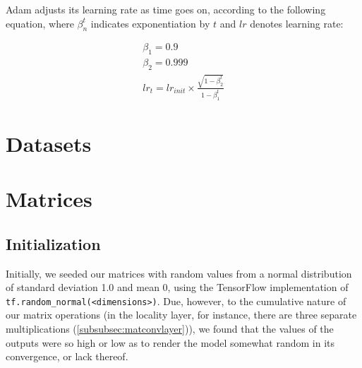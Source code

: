 Adam adjusts its learning rate as time goes on, according to the following 
equation, where $\beta_n^t$ indicates exponentiation by $t$ and $lr$ denotes 
learning rate:
\begin{figure}[h]
	\begin{minipage}[b]{.38\textwidth}
		\centering
		\begin{gather}
			\nonumber
			\beta_1 = 0.9\\
			\nonumber
			\beta_2 = 0.999\\
			\nonumber
			lr_t = lr_{init} \times \frac{\sqrt{1-\beta_2^t}}{1-\beta_1^t}
		\end{gather}
	\end{minipage}
	\hfill
	\begin{minipage}{.6\textwidth}
		\centering
	\end{minipage}
\end{figure}

\section{Datasets}


\section{Matrices}
\subsection{Initialization}
Initially, we seeded our matrices with random values from a normal distribution 
of standard deviation 1.0 and mean 0, using the TensorFlow implementation of 
\texttt{tf.random\_normal(<dimensions>)}. Due, however, to the cumulative nature 
of our matrix operations (in the locality layer, for instance, there are three 
separate multiplications (\ref{subsubsec:matconvlayer})), we found that the 
values of the outputs were so high or low as to render the model somewhat random 
in its convergence, or lack thereof.

